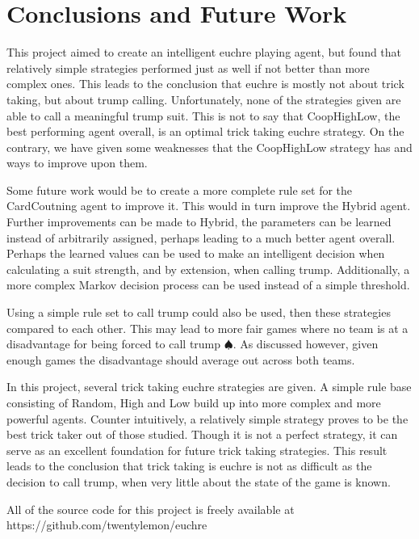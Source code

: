 
\section{Conclusions and Future Work}

This project aimed to create an intelligent euchre playing agent, but found that relatively simple strategies performed
just as well if not better than more complex ones. This leads to the conclusion that euchre is mostly not about trick taking,
but about trump calling. Unfortunately, none of the strategies given are able to call a meaningful trump suit. This is not to say
that CoopHighLow, the best performing agent overall, is an optimal trick taking euchre strategy. On the contrary, we have given some
weaknesses that the CoopHighLow strategy has and ways to improve upon them.

Some future work would be to create a more complete rule set for the CardCoutning agent to improve it. This would in turn improve
the Hybrid agent. Further improvements can be made to Hybrid, the parameters can be learned instead of arbitrarily assigned, perhaps
leading to a much better agent overall. Perhaps the learned values can be used to make an intelligent decision when calculating a suit
strength, and by extension, when calling trump. Additionally, a more complex Markov decision process can be used instead of a simple threshold.

Using a simple rule set to call trump could also be used, then these strategies compared to each other. This may lead to more
fair games where no team is at a disadvantage for being forced to call trump $\spadesuit$. As discussed however, given enough
games the disadvantage should average out across both teams.

In this project, several trick taking euchre strategies are given. A simple rule base consisting of Random, High and Low build
up into more complex and more powerful agents. Counter intuitively, a relatively simple strategy proves to be the best trick taker
out of those studied. Though it is not a perfect strategy, it can serve as an excellent foundation for future trick taking strategies.
This result leads to the conclusion that trick taking is euchre is not as difficult as the decision to call trump, when very little
about the state of the game is known.

All of the source code for this project is freely available at\\https://github.com/twentylemon/euchre
